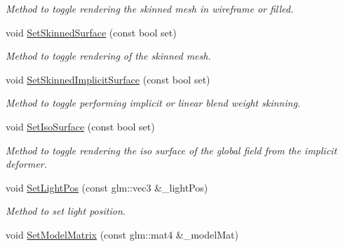 \begin{DoxyCompactItemize}
\begin{DoxyCompactList}\small\item\em Method to toggle rendering the skinned mesh in wireframe or filled. \end{DoxyCompactList}\item 
void \hyperlink{classModel_aa06ad99f920b3fb4366acd2bc32046cc}{Set\+Skinned\+Surface} (const bool set)\hypertarget{classModel_aa06ad99f920b3fb4366acd2bc32046cc}{}\label{classModel_aa06ad99f920b3fb4366acd2bc32046cc}

\begin{DoxyCompactList}\small\item\em Method to toggle rendering of the skinned mesh. \end{DoxyCompactList}\item 
void \hyperlink{classModel_a6fef9eb1dcb56f2a1bdc649a5fe85fac}{Set\+Skinned\+Implicit\+Surface} (const bool set)\hypertarget{classModel_a6fef9eb1dcb56f2a1bdc649a5fe85fac}{}\label{classModel_a6fef9eb1dcb56f2a1bdc649a5fe85fac}

\begin{DoxyCompactList}\small\item\em Method to toggle performing implicit or linear blend weight skinning. \end{DoxyCompactList}\item 
void \hyperlink{classModel_a21e65d33bdae007a4a4f36a138da358e}{Set\+Iso\+Surface} (const bool set)\hypertarget{classModel_a21e65d33bdae007a4a4f36a138da358e}{}\label{classModel_a21e65d33bdae007a4a4f36a138da358e}

\begin{DoxyCompactList}\small\item\em Method to toggle rendering the iso surface of the global field from the implicit deformer. \end{DoxyCompactList}\item 
void \hyperlink{classModel_afad9aa7af2bdbdf511dcd3e0748a2d9a}{Set\+Light\+Pos} (const glm\+::vec3 \&\+\_\+light\+Pos)\hypertarget{classModel_afad9aa7af2bdbdf511dcd3e0748a2d9a}{}\label{classModel_afad9aa7af2bdbdf511dcd3e0748a2d9a}

\begin{DoxyCompactList}\small\item\em Method to set light position. \end{DoxyCompactList}\item 
void \hyperlink{classModel_a88d681e1ea367b0140b04ae84ee72512}{Set\+Model\+Matrix} (const glm\+::mat4 \&\+\_\+model\+Mat)\hypertarget{classModel_a88d681e1ea367b0140b04ae84ee72512}{}\label{classModel_a88d681e1ea367b0140b04ae84ee72512}


\end{DoxyCompactItemize}
